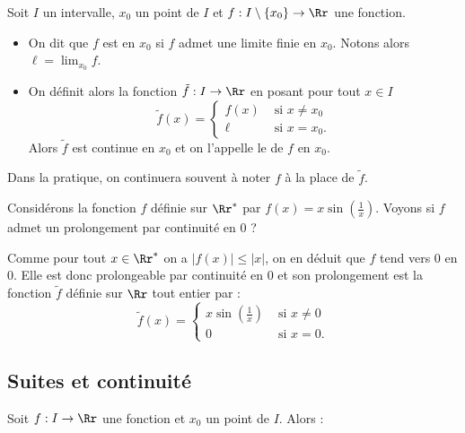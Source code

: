 \documentclass[class=report,crop=false]{standalone}
\begin{document}
\begin{definition}
Soit $I$ un intervalle, $x_0$ un point de $I$ et $f:I\setminus\{x_0\}\to\Rr$ une fonction.
\begin{itemize}
  \item  On dit que $f$ est 
  en $x_0$ si $f$ admet une
  limite finie en $x_0$. Notons alors $\ell=\displaystyle\lim_{x_0} f$.
  \item On définit alors la fonction $\tilde f:I\to\Rr$ en posant pour tout $x\in I$
  \[
  \tilde f(x) =
  \begin{cases}
  f(x) &\text{ si } x\neq x_0\\
  \ell &\text{ si } x=x_0.
  \end{cases}
  \]
  Alors $\tilde f$ est continue en $x_0$ et on l'appelle le  de $f$ en $x_0$.
\end{itemize}
\end{definition}



Dans la pratique, on continuera souvent à noter $f$ à la place de $\tilde f$.

\begin{exemple}
Considérons la fonction $f$ définie sur $\Rr^*$ par $f(x)=x\sin\left(\frac1x\right)$.
Voyons si $f$ admet un prolongement par continuité en $0$ ?


Comme pour tout $x\in\Rr^*$ on a $\vert f(x)\vert\leq \vert x\vert$, on en déduit que $f$ tend vers $0$ en $0$.
Elle est donc prolongeable par continuité en $0$ et son prolongement est la fonction $\tilde f$
définie sur $\Rr$ tout entier par :
\[
\tilde f(x) =
  \begin{cases}
  x\sin\left(\frac1x\right) &\text{ si } x\neq 0\\
  0 &\text{ si } x=0.
  \end{cases}
\]

\end{exemple}

\subsection{Suites et continuité}

\begin{proposition}
Soit $f:I\to\Rr$ une fonction et $x_0$ un point de $I$. Alors :
\end{proposition}
\end{document}
